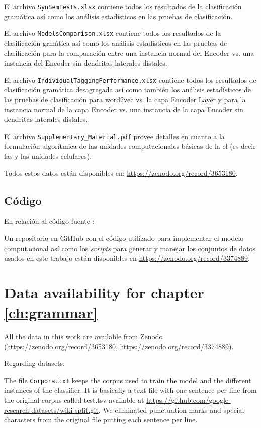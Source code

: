 {El archivo \texttt{SynSemTests.xlsx} contiene todos los resultados de la clasificación gramática así como los análisis estadísticos en las pruebas de clasificación.

El archivo \texttt{ModelsComparison.xlsx} contiene todos los resultados de la clasificación grmática así como los análisis estadísticos en las pruebas de clasificación para la comparación entre una instancia normal del Encoder vs. una instancia del Encoder sin dendritas laterales distales.

El archivo \texttt{IndividualTaggingPerformance.xlsx} contiene todos los resultados de clasificación gramática desagregada así como también los análisis estadísticos de las pruebas de clasificación  para word2vec vs. la capa Encoder Layer y para la instancia normal de la capa Encoder vs. una instancia de la capa Encoder sin dendritas laterales distales.

El archivo \texttt{Supplementary\_Material.pdf} provee detalles en cuanto a la formulación algorítmica de las unidades computacionales básicas de la \gls{el} (es decir las  y las unidades celulares).

Todos estos datos están disponibles en: \url{https://zenodo.org/record/3653180}.

\subsection{Código}

En relación al código fuente \cite{dematties_dario_2019_3374889}:

Un repositorio en GitHub con el código utilizado para implementar el modelo computacional así como los \emph{scripts} para generar y manejar los conjuntos de datos usados en este trabajo están disponibles en \url{https://zenodo.org/record/3374889}.
}{
\section{Data availability for chapter \ref{ch:grammar}}

All the data in this work are available from Zenodo (\url{https://zenodo.org/record/3653180, https://zenodo.org/record/3374889}).

Regarding datasets:

The file \texttt{Corpora.txt} keeps the corpus used to train the model and the different instances of the classifier. It is basically a text file with one sentence per line from the original corpus called test.tsv available at \url{https://github.com/google-research-datasets/wiki-split.git}. We eliminated punctuation marks and special characters from the original file putting each sentence per line.

}
